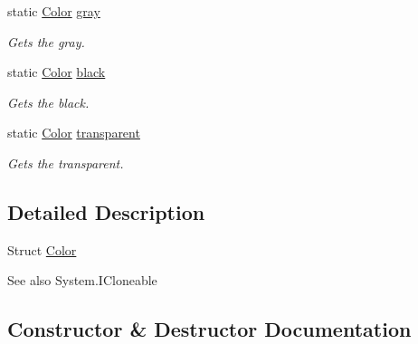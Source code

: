 \begin{DoxyCompactItemize}
static \hyperlink{struct_lerp2_a_p_i_1_1_optimizers_1_1_color}{Color} \hyperlink{struct_lerp2_a_p_i_1_1_optimizers_1_1_color_a501617d7e9706f0a0a9dc351873a7638}{gray}
\begin{DoxyCompactList}\small\item\em Gets the gray. \end{DoxyCompactList}\item 
static \hyperlink{struct_lerp2_a_p_i_1_1_optimizers_1_1_color}{Color} \hyperlink{struct_lerp2_a_p_i_1_1_optimizers_1_1_color_ad91fc9917cf1cf0f62a5347dc02db2e4}{black}
\begin{DoxyCompactList}\small\item\em Gets the black. \end{DoxyCompactList}\item 
static \hyperlink{struct_lerp2_a_p_i_1_1_optimizers_1_1_color}{Color} \hyperlink{struct_lerp2_a_p_i_1_1_optimizers_1_1_color_a015eccfb9ba8a84a77f63da640ed0735}{transparent}
\begin{DoxyCompactList}\small\item\em Gets the transparent. \end{DoxyCompactList}\end{DoxyCompactItemize}


\subsection{Detailed Description}
Struct \hyperlink{struct_lerp2_a_p_i_1_1_optimizers_1_1_color}{Color} 

\begin{DoxySeeAlso}{See also}
System.\+I\+Cloneable


\end{DoxySeeAlso}


\subsection{Constructor \& Destructor Documentation}
\mbox{\label{struct_lerp2_a_p_i_1_1_optimizers_1_1_color_acaad4a6bc34a1590d543534a835930cc}} 
